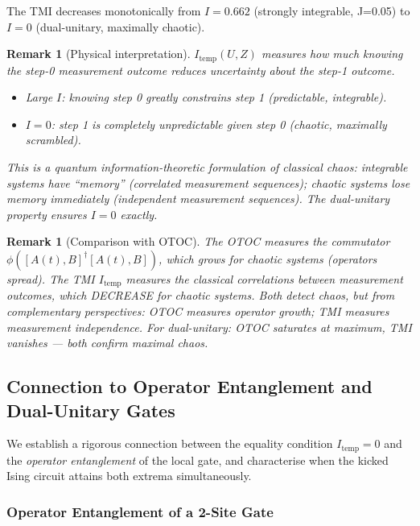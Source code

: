 \documentclass[12pt,a4paper]{article}
\newtheorem{remark}[theorem]{Remark}
\begin{document}
\vspace{4pt}\noindent
The TMI decreases monotonically from $I=0.662$ (strongly integrable, J=0.05)
to $I=0$ (dual-unitary, maximally chaotic).

\begin{remark}[Physical interpretation]\label{rmk:tmi_physical}
$I_\mathrm{temp}(U,Z)$ measures how much knowing the step-0 measurement outcome
reduces uncertainty about the step-1 outcome.
\begin{itemize}
\item Large $I$: knowing step 0 greatly constrains step 1 (predictable, integrable).
\item $I=0$: step 1 is completely unpredictable given step 0 (chaotic, maximally scrambled).
\end{itemize}
This is a quantum information-theoretic formulation of classical chaos:
integrable systems have ``memory'' (correlated measurement sequences);
chaotic systems lose memory immediately (independent measurement sequences).
The dual-unitary property ensures $I=0$ exactly.
\end{remark}

\begin{remark}[Comparison with OTOC]\label{rmk:tmi_vs_otoc}
The OTOC measures the commutator $\phi([A(t),B]^\dagger[A(t),B])$, which
grows for chaotic systems (operators spread).
The TMI $I_\mathrm{temp}$ measures the classical correlations between measurement
outcomes, which DECREASE for chaotic systems.
Both detect chaos, but from complementary perspectives:
OTOC measures operator growth; TMI measures measurement independence.
For dual-unitary: OTOC saturates at maximum, TMI vanishes --- both confirm maximal chaos.
\end{remark}

\subsection{Connection to Operator Entanglement and Dual-Unitary Gates}
\label{sec:op_entanglement}

We establish a rigorous connection between the equality condition
$I_\mathrm{temp}=0$ and the \emph{operator entanglement} of the local gate,
and characterise when the kicked Ising circuit attains both extrema simultaneously.

\subsubsection{Operator Entanglement of a 2-Site Gate}
\end{document}
